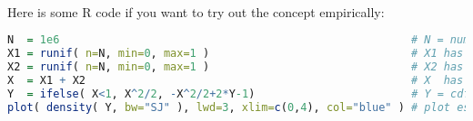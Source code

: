 \begin{example}
\label{ex:pit}
\\
Here is some R code if you want to try out the concept empirically:\footnotemark
{}
\begin{lstlisting}[language=R]
N  = 1e6                                                      # N = number of samples
X1 = runif( n=N, min=0, max=1 )                               # X1 has uniform distribution
X2 = runif( n=N, min=0, max=1 )                               # X2 has uniform distribution
X  = X1 + X2                                                  # X  has triangular distribution N1(x)
Y  = ifelse( X<1, X^2/2, -X^2/2+2*Y-1)                        # Y = cdf_x( X ) has uniform distribution
plot( density( Y, bw="SJ" ), lwd=3, xlim=c(0,4), col="blue" ) # plot estimated pdf of Y
\end{lstlisting}
\end{example}
